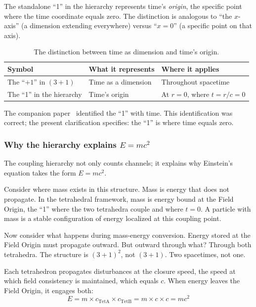 \documentclass[aps,prd,preprint,superscriptaddress,showpacs,preprintnumbers,amsmath,amssymb,nofootinbib]{revtex4-2}
\begin{document}
The standalone ``1'' in the hierarchy represents time's \emph{origin}, the specific point where the time coordinate equals zero. The distinction is analogous to ``the $x$-axis'' (a dimension extending everywhere) versus ``$x = 0$'' (a specific point on that axis).

\begin{table}[H]
\centering
\begin{tabular*}{0.95\textwidth}{@{\extracolsep{\fill}} lll @{}}
\toprule
\textbf{Symbol} & \textbf{What it represents} & \textbf{Where it applies} \\
\midrule
The ``$+1$'' in $(3+1)$ & Time as a dimension & Throughout spacetime \\
The ``1'' in the hierarchy & Time's origin & At $r = 0$, where $t = r/c = 0$ \\
\bottomrule
\end{tabular*}
\caption{The distinction between time as dimension and time's origin.}
\label{tab:one-vs-plusone}
\end{table}

The companion paper~\cite{paper6} identified the ``1'' with time. This identification was correct; the present clarification specifies: the ``1'' is where time equals zero.

\subsubsection*{Why the hierarchy explains $E = mc^2$}

The coupling hierarchy not only counts channels; it explains why Einstein's equation takes the form $E = mc^2$.

Consider where mass exists in this structure. Mass is energy that does not propagate. In the tetrahedral framework, mass is energy bound at the Field Origin, the ``1'' where the two tetrahedra couple and where $t = 0$. A particle with mass is a stable configuration of energy localized at this coupling point.

Now consider what happens during mass-energy conversion. Energy stored at the Field Origin must propagate outward. But outward through what? Through both tetrahedra. The structure is $(3+1)^2$, not $(3+1)$. Two spacetimes, not one.

Each tetrahedron propagates disturbances at the closure speed, the speed at which field consistency is maintained, which equals $c$. When energy leaves the Field Origin, it engages both:
\begin{equation}
E = m \times c_{\text{TetA}} \times c_{\text{TetB}} = m \times c \times c = mc^2
\end{equation}
\end{document}
